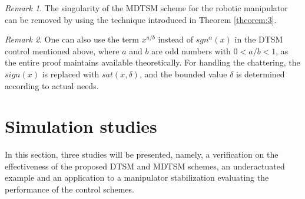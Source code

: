 \documentclass[3p]{elsarticle}
\theoremstyle{plain}
\theoremstyle{remark}
\newtheorem{myrem}{Remark}
\begin{document}
\begin{myrem}
The singularity of the MDTSM scheme for the robotic manipulator can be removed by using the technique introduced in Theorem \ref{theorem:3}.
\end{myrem}
\begin{myrem}
One can also use the term $x^{a/b}$ instead of $sgn^\alpha(x)$ in the DTSM control mentioned above, where $a$ and $b$ are odd numbers with $0<a/b<1$, as the entire proof maintains available theoretically. For handling the chattering, the $sign(x)$ is replaced with $sat(x,\delta)$, and the bounded value $\delta$ is determined according to actual needs.
\end{myrem}
\section{Simulation studies}\label{sec:4}
In this section, three studies will be presented, namely, a verification on the effectiveness of the proposed DTSM and MDTSM schemes, an underactuated example and an application to a manipulator stabilization evaluating the performance of the control schemes.
\end{document}
